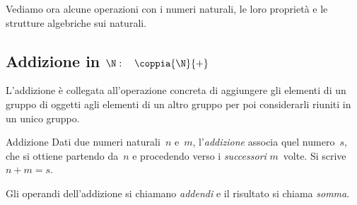 Vediamo ora alcune operazioni con i numeri naturali, le loro proprietà e le 
strutture algebriche sui naturali.

\subsection{Addizione in $\N: \quad \coppia{\N}{+}$}

L'addizione è collegata all'operazione concreta di aggiungere gli elementi di 
un gruppo di oggetti agli elementi di un altro gruppo per poi considerarli 
riuniti in un unico gruppo.

\begin{definizione}{Addizione}{}
Dati due numeri naturali~\(n\) e~\(m\), l'\emph{addizione} associa quel 
numero~\(s\), che si ottiene partendo da~\(n\) e procedendo verso i 
\emph{successori} \(m\)~volte. Si scrive~\(n+m=s\).

Gli operandi dell'addizione si chiamano \emph{addendi} e il risultato si 
chiama \emph{somma}.
\end{definizione}

